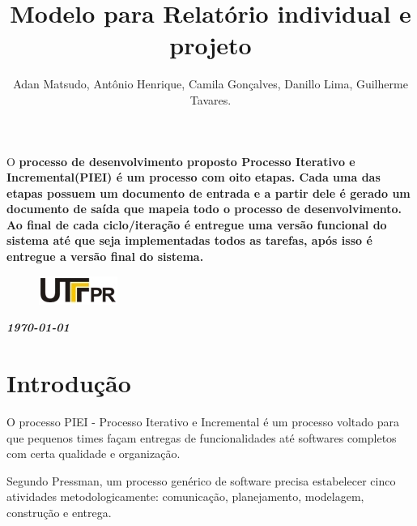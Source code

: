 \documentclass[	DIV=calc,%
							paper=a4,%
							fontsize=12pt,%
							onecolumn]{scrartcl}	 					%
\title{Modelo para Relatório individual e projeto}					%
\author{Adan Matsudo, Antônio Henrique, Camila Gonçalves, Danillo Lima, Guilherme Tavares.}  	%
\date{}																				%
\newcommand{\initial}[1]{%
     \lettrine[lines=3,lhang=0.3,nindent=0em]{
     				\color{DarkGoldenrod}
     				{\textsf{#1}}}{}}
\begin{document}
\maketitle
\thispagestyle{fancy} 	
\thispagestyle{empty}		%




\initial{O}\textbf{ processo de desenvolvimento proposto Processo Iterativo e Incremental(PIEI) é um processo com oito etapas. Cada uma das etapas possuem um documento de entrada e a partir dele é gerado um documento de saída que mapeia todo o processo de desenvolvimento. Ao final de cada ciclo/iteração é entregue uma versão funcional do sistema até que seja implementadas todos as tarefas, após isso é entregue a versão final do sistema. }

\begin{figure}
	\centering
	\includegraphics{utfpr}
\end{figure}

\vspace{3cm}
\centerline{\textit{\textbf{\today}}}

\clearpage
    \renewcommand*\listfigurename{Lista de figuras}
\listoffigures

\renewcommand*\listtablename{Lista de tabelas}
\listoftables

\clearpage
\renewcommand{\contentsname}{Sumário}
\tableofcontents
\clearpage

\section{Introdução}
O processo PIEI - Processo Iterativo e Incremental é um processo voltado para que pequenos times façam entregas de funcionalidades até softwares completos com certa qualidade e organização.

Segundo Pressman\cite{pressman:14}, um processo genérico de software precisa estabelecer cinco atividades metodologicamente: comunicação, planejamento, modelagem, construção e entrega. 
\end{document}
